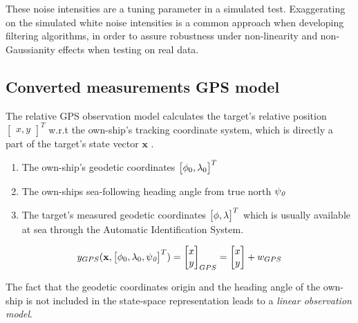 These noise intensities are a tuning parameter in a simulated test. Exaggerating on the simulated white noise intensities is a common approach when developing filtering algorithms, in order to assure robustness under non-linearity and non-Gaussianity effects when testing on real data.

\subsection{Converted measurements GPS model}


The relative GPS observation model calculates the target's relative position $\begin{bmatrix}x, y\end{bmatrix}^{T} $ w.r.t the own-ship's tracking coordinate system, which is directly a part of the target's state vector $\mathbf{x}$
. 

\begin{enumerate}
\item The own-ship's geodetic coordinates $\begin{bmatrix}{\phi}_{0}, {\lambda}_{0} \end{bmatrix}^{T}$
\item The own-ships sea-following heading angle from true north ${\psi}_{\textit{0}}$
\item The target's measured geodetic coordinates $\begin{bmatrix}{\phi}, {\lambda}\end{bmatrix}^{T}$ which is usually available at sea through the Automatic Identification System.
\end{enumerate}




\begin{equation}
{{y}}_{GPS}(\mathbf{x},\begin{bmatrix}{\phi}_{0}, {\lambda}_{0}, {\psi}_{\textit{0}} \end{bmatrix}^{T}) = \begin{bmatrix}
x \\
y
\end{bmatrix}_{GPS} = \begin{bmatrix}
x \\
y
\end{bmatrix} + {w}_{GPS}
\end{equation}

The fact that the geodetic coordinates origin and the heading angle of the own-ship is not included in the state-space representation leads to a \emph{linear observation model}.

